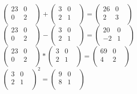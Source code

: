 \documentclass[14pt,a4paper]{scrartcl}
\begin{document}
\noindent
$
\begin{pmatrix}
23&0&\\0&2&\\\end{pmatrix}
+
\begin{pmatrix}
3&0&\\2&1&\\\end{pmatrix}
=
\begin{pmatrix}
26&0&\\2&3&\\\end{pmatrix}
$
\\
$
\begin{pmatrix}
23&0&\\0&2&\\\end{pmatrix}
-
\begin{pmatrix}
3&0&\\2&1&\\\end{pmatrix}
=
\begin{pmatrix}
20&0&\\-2&1&\\\end{pmatrix}
$
\\
$
\begin{pmatrix}
23&0&\\0&2&\\\end{pmatrix}
*
\begin{pmatrix}
3&0&\\2&1&\\\end{pmatrix}
=
\begin{pmatrix}
69&0&\\4&2&\\\end{pmatrix}
$
\\
$
\begin{pmatrix}
3&0&\\2&1&\\\end{pmatrix}
^2
=
\begin{pmatrix}
9&0&\\8&1&\\\end{pmatrix}
$
\\
\end{document}

